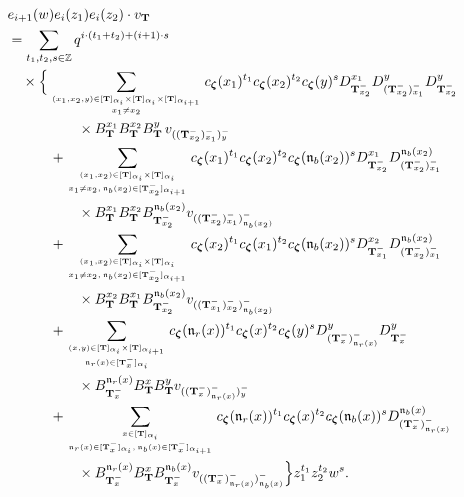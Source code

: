 \documentclass[12pt]{amsart}
\numberwithin{equation}{thm}
\newcommand\ZZ{\mathbb Z}
\newcommand\bT{\mathbf T}
\newcommand\fn{\mathfrak n}
\renewcommand\a{\alpha}  %
\newcommand\Bz{\boldsymbol\zeta}
\begin{document}
\begin{align}
\label{ei+1w eiz1 eiz2 vbT} 
& e_{i+1} (w) e_i(z_1) e_i(z_2) \cdot v_{\bT} 
\\
\notag
&= \sum_{t_1,t_2,s \in \ZZ} q^{ i \cdot (t_1+t_2) + (i+1) \cdot s} 
	\\ \notag
	& \quad \times \Big\{ 
	\sum_{(x_1,x_2,y) \in [\bT]_{\a_i} \times [\bT]_{\a_i} \times [\bT]_{\a_{i+1}} \atop x_1 \not=x_2} 
		c_{\Bz} (x_1)^{t_1} c_{\Bz}(x_2)^{t_2} c_{\Bz} (y)^s 
		D_{\bT_{x_2}^-}^{x_1} D_{(\bT_{x_2}^-)_{x_1}^-}^y D_{\bT_{x_2}^-}^y
		\\ \notag
		& \hspace{5em} \times 
		 B_{\bT}^{x_1}  B_{\bT}^{x_2} B_{\bT}^y \, v_{((\bT_{x_2}^-)_{x_1}^-)_y^-} 
	\\ \notag & \hspace{3em} 
	+ \sum_{(x_1,x_2) \in [\bT]_{\a_i} \times [\bT]_{\a_i} \atop x_1 \not=x_2, \, \fn_b(x_2) \in [\bT_{x_2}^-]_{\a_{i+1}}} 
		c_{\Bz} (x_1)^{t_1} c_{\Bz}(x_2)^{t_2} c_{\Bz} (\fn_b(x_2))^s 
		D_{\bT_{x_2}^-}^{x_1} D_{(\bT_{x_2}^-)_{x_1}^-}^{\fn_b(x_2)}
		\\ & \notag \hspace{5em} \times 
		B_{\bT}^{x_1} B_{\bT}^{x_2}  B_{\bT_{x_2}^-}^{\fn_b(x_2)} v_{((\bT_{x_2}^-)_{x_1}^-)_{\fn_b(x_2)}^-} 
	\\ & \notag \hspace{3em} 
	+ \sum_{(x_1,x_2) \in [\bT]_{\a_i} \times [\bT]_{\a_i} \atop x_1 \not= x_2, \, \fn_b(x_2) \in [\bT_{x_2}^-]_{\a_{i+1}}}
		c_{\Bz} (x_2)^{t_1} c_{\Bz}(x_1)^{t_2} c_{\Bz} (\fn_b(x_2))^s 
		D_{\bT_{x_1}^-}^{x_2} D_{(\bT_{x_2}^-)_{x_1}^-}^{\fn_b(x_2)} 
		\\ & \notag \hspace{5em} \times 
		B_{\bT}^{x_2} B_{\bT}^{x_1}  B_{\bT_{x_2}^-}^{\fn_b(x_2)} v_{((\bT_{x_1}^-)_{x_2}^-)_{\fn_b (x_2)}^-}  
	\\ & \notag \hspace{3em} 
	+ \sum_{(x,y) \in [\bT]_{\a_i} \times [\bT]_{\a_{i+1}} \atop \fn_r(x) \in [\bT_x^-]_{\a_i}} 
		c_{\Bz} (\fn_r(x))^{t_1} c_{\Bz}(x)^{t_2} c_{\Bz} (y)^s 
		D_{(\bT_{x}^-)_{\fn_r(x)}^-}^y D_{\bT_{x}^-}^y 
		\\ & \notag \hspace{5em} \times 
		B_{\bT_{x}^-}^{\fn_r(x)} B_{\bT}^{x} B_{\bT}^y v_{((\bT_{x}^-)_{\fn_r(x)}^-)_y^-} 
	\\ & \notag \hspace{3em} 
	+ \sum_{x \in [\bT]_{\a_i} \atop \fn_r(x) \in [\bT_x^-]_{\a_i}, \, \fn_b(x) \in [\bT_x^-]_{\a_{i+1}}} 
		c_{\Bz} (\fn_r(x))^{t_1} c_{\Bz}(x)^{t_2} c_{\Bz} (\fn_b(x))^s 
		D_{(\bT_{x}^-)_{\fn_r(x)}^-}^{\fn_b(x)}
		\\ & \notag \hspace{5em} \times 
		B_{\bT_{x}^-}^{\fn_r(x)} B_{\bT}^{x}  B_{\bT_{x}^-}^{\fn_b(x)}  v_{((\bT_{x}^-)_{\fn_r(x)}^-)_{\fn_b(x)}^-}   
	\Big\} z_1^{t_1} z_2^{t_2} w^s.
\end{align}
\end{document}
